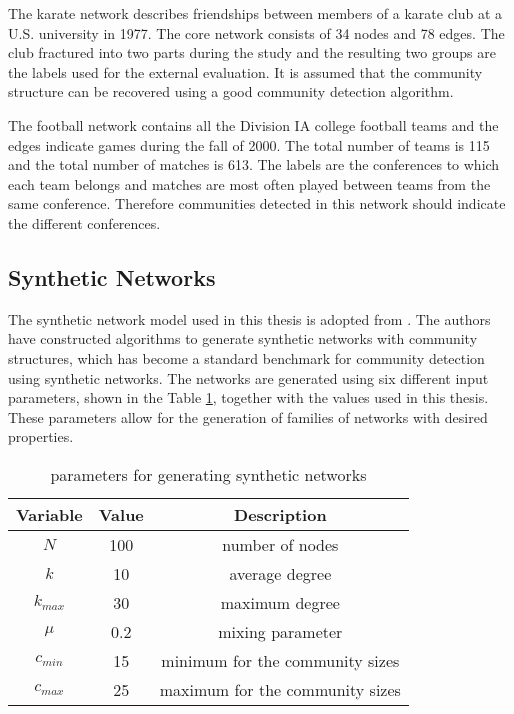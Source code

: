 \documentclass[\main/thesis.tex]{subfiles}
\begin{document}
The karate network \cite{zachary1977information} describes friendships between members of a karate club at a U.S. university in 1977. The core network consists of 34 nodes and 78 edges. The club fractured into two parts during the study and the resulting two groups are the labels used for the external evaluation. It is assumed that the community structure can be recovered using a good community detection algorithm.

The football network \cite{girvan2002community} contains all the Division IA college football teams and the edges indicate games during the fall of 2000. The total number of teams is 115 and the total number of matches is 613. The labels are the conferences to which each team belongs and matches are most often played between teams from the same conference. Therefore communities detected in this network should indicate the different conferences. 
\subsection*{Synthetic Networks}
The synthetic network model used in this thesis is adopted from \cite{lancichinetti2009benchmarks}. The authors have constructed algorithms to generate synthetic networks with community structures, which has become a standard benchmark for community detection using synthetic networks. The networks are generated using six different input parameters, shown in the Table \ref{synthetic_network_parameter}, together with the values used in this thesis. These parameters allow for the generation of families of networks with desired properties.
\begin{table}[]
\centering
\caption{parameters for generating synthetic networks}
\label{synthetic_network_parameter}
\begin{tabular}{ccc}
\hline
Variable & Value & Description                     \\ \hline
$N$     & 100   & number of nodes                 \\
$k$     & 10    & average degree                  \\
$k_{max}$  & 30    & maximum degree                  \\
$\mu$ & 0.2   & mixing parameter                \\
$c_{min}$  & 15    & minimum for the community sizes \\
$c_{max}$  & 25    & maximum for the community sizes \\ \hline
\end{tabular}
\end{table}
\end{document}
